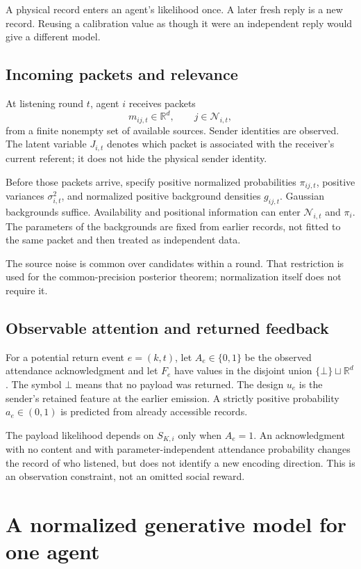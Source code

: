 \documentclass[11pt]{article}
\theoremstyle{definition}
\theoremstyle{remark}
\newcommand{\R}{\mathbb R}
\begin{document}
A physical record enters an agent's likelihood once. A later fresh reply is a new record. Reusing a calibration value as though it were an independent reply would give a different model.

\subsection{Incoming packets and relevance}

At listening round \(t\), agent \(i\) receives packets
\[
m_{ij,t}\in\R^d,\qquad j\in\mathcal N_{i,t},
\]
from a finite nonempty set of available sources. Sender identities are observed. The latent variable \(J_{i,t}\) denotes which packet is associated with the receiver's current referent; it does not hide the physical sender identity.

Before those packets arrive, specify positive normalized probabilities \(\pi_{ij,t}\), positive variances \(\sigma_{i,t}^2\), and normalized positive background densities \(g_{ij,t}\). Gaussian backgrounds suffice. Availability and positional information can enter \(\mathcal N_{i,t}\) and \(\pi_i\). The parameters of the backgrounds are fixed from earlier records, not fitted to the same packet and then treated as independent data.

The source noise is common over candidates within a round. That restriction is used for the common-precision posterior theorem; normalization itself does not require it.

\subsection{Observable attention and returned feedback}

For a potential return event \(e=(k,t)\), let \(A_e\in\{0,1\}\) be the observed attendance acknowledgment and let \(F_e\) have values in the disjoint union \(\{\bot\}\sqcup\R^d\). The symbol \(\bot\) means that no payload was returned. The design \(u_e\) is the sender's retained feature at the earlier emission. A strictly positive probability \(a_e\in(0,1)\) is predicted from already accessible records.

The payload likelihood depends on \(S_{K,i}\) only when \(A_e=1\). An acknowledgment with no content and with parameter-independent attendance probability changes the record of who listened, but does not identify a new encoding direction. This is an observation constraint, not an omitted social reward.

\section{A normalized generative model for one agent}
\end{document}
